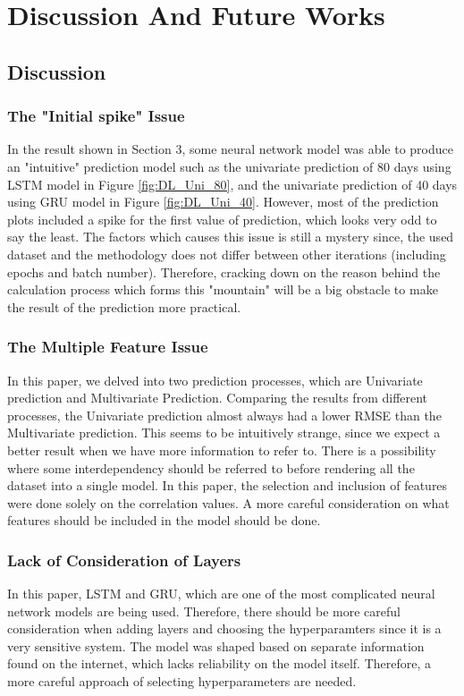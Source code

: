 \section{Discussion And Future Works}

\subsection{Discussion}
\subsubsection{The "Initial spike" Issue}
In the result shown in Section 3, some neural network model was able to produce an "intuitive" prediction model such as the univariate prediction of 80 days using LSTM model in Figure \ref{fig:DL_Uni_80}, and the univariate prediction of 40 days using GRU model in Figure \ref{fig:DL_Uni_40}. However, most of the prediction plots included a spike for the first value of prediction, which looks very odd to say the least. The factors which causes this issue is still a mystery since, the used dataset and the methodology does not differ between other iterations (including epochs and batch number). Therefore, cracking down on the reason behind the calculation process which forms this "mountain" will be a big obstacle to make the result of the prediction more practical. 

\subsubsection{The Multiple Feature Issue}
In this paper, we delved into two prediction processes, which are Univariate prediction and Multivariate Prediction. Comparing the results from different processes, the Univariate prediction almost always had a lower RMSE than the Multivariate prediction. This seems to be intuitively strange, since we expect a better result when we have more information to refer to. There is a possibility where some interdependency should be referred to before rendering all the dataset into a single model. In this paper, the selection and inclusion of features were done solely on the correlation values. A more careful consideration on what features should be included in the model should be done. 

\subsubsection{Lack of Consideration of Layers}
In this paper, LSTM and GRU, which are one of the most complicated neural network models are being used. Therefore, there should be more careful consideration when adding layers and choosing the hyperparamters since it is a very sensitive system. The model was shaped based on separate information found on the internet, which lacks reliability on the model itself. Therefore, a more careful approach of selecting hyperparameters are needed. 

